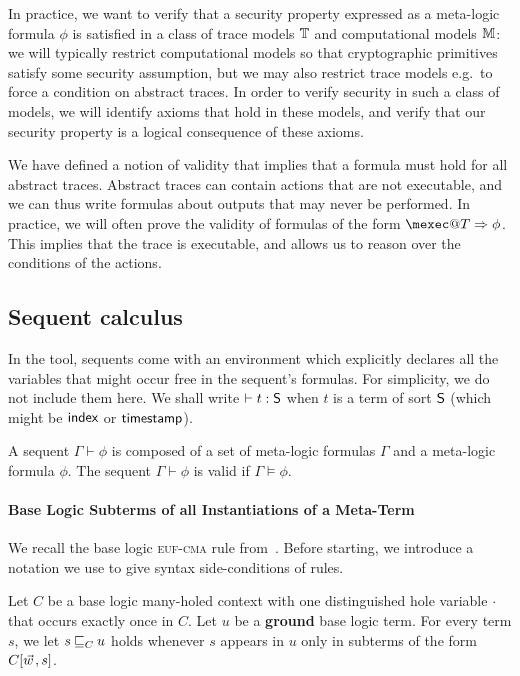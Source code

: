 In practice, we want to verify that a security property expressed as a
meta-logic formula $\phi$ is satisfied in a class of trace models
$\mathbb{T}$ and computational models $\mathbb{M}$: we will typically restrict computational
models so that cryptographic primitives satisfy some security assumption,
but we may also restrict trace models e.g.\ to force a condition on
abstract traces. In order to verify security in such a class of models,
we will identify axioms that hold in these models, and verify that our
security property is a logical consequence of these axioms.

\begin{remark}
  We have defined a notion of validity that implies that a formula must hold for all abstract traces. Abstract traces can contain actions that are not executable, and we can thus write formulas about outputs that may never be performed. In practice, we will often prove the validity of formulas of the form $\mexec@T \Rightarrow \phi$. This implies that the trace is executable, and allows us to reason over the conditions of the actions.
\end{remark}

\subsection{Sequent calculus}

In the tool, sequents come with an environment which explicitly
declares all the variables that might occur free in the sequent's formulas.
For simplicity, we do not include them here. We shall write $\vdash t:\textsf{S}$
when $t$ is a term of sort $\textsf{S}$ (which might be $\textsf{index}$ or $\textsf{timestamp}$).

\begin{definition}
  A sequent $\Gamma \vdash \phi$ is composed of a set of meta-logic formulas
  $\Gamma$ and a meta-logic formula $\phi$.
  The sequent $\Gamma \vdash \phi$ is valid if $\Gamma \models \phi$.
\end{definition}


\paragraph{Base Logic Subterms of all Instantiations of a Meta-Term}
We recall the base logic \textsc{euf-cma} rule from~\cite{DBLP:conf/eurosp/Koutsos19}. Before starting, we introduce a notation we use to give syntax side-conditions of rules.
\begin{definition}
  \label{def:occ-sc}
  Let $C$ be a base logic many-holed context with one distinguished hole variable $\cdot$ that occurs exactly once in $C$. Let $u$ be a \textbf{ground} base logic term. For every term $s$, we let $s \mathbin{\sqsubseteq}_{C} u$ holds whenever $s$ appears in $u$ only in subterms of the form $C[\pvec{w},s]$.
\end{definition}

